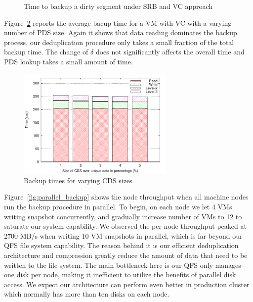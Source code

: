 
\begin{figure}[htbp]
  \centering
  \caption{Time to backup a dirty segment under SRB and VC approach}
  \label{fig:srb_vs_vc}
\end{figure}

Figure~\ref{fig:single_vm_backup} reports the average bacup time for a VM with VC with a varying number
of PDS size.
Again it shows that data reading dominates the backup process, our deduplication
procedure only takes a small fraction of the total backup time. 
The change of $\delta$ does not significantly affects the overall time and
PDS lookup takes a small amount of time.


\begin{figure}
    \centering
    \includegraphics[width=3in]{figures/single_backup_time}
    \caption{Backup times for varying CDS sizes}
    \label{fig:single_vm_backup}
\end{figure}


    Figure~\ref{fig:parallel_backup} shows the node throughput when all machine nodes run
the backup procedure in parallel.
To begin, on each node we let 4 VMs writing snapshot concurrently, and gradually 
increase number of VMs to 12 to saturate our system capability. We observed 
the per-node throughput peaked at 2700 MB/s when writing 10 VM snapshots in parallel, 
which is far beyond our QFS file system capability. The reason behind it is our efficient
deduplication architecture and compression greatly reduce the amount of data that need to be written to
the file system. The main bottleneck here is our QFS only manages one disk per node, 
making it inefficient to utilize the benefits of parallel disk access. We expect our architecture can
perform even better in production cluster which normally has more than ten disks on each node.



